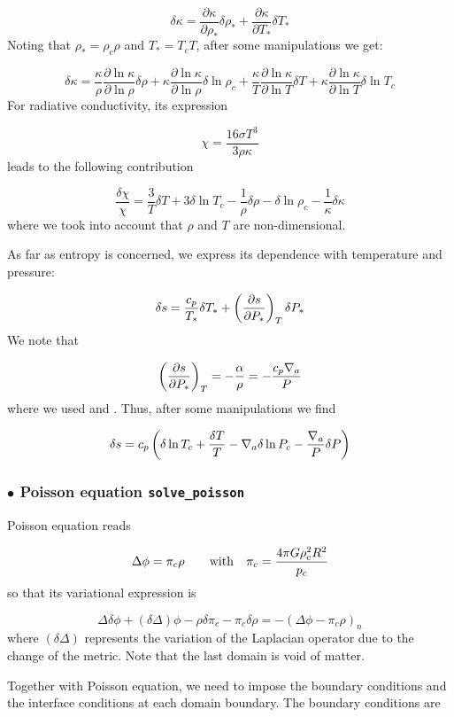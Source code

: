 \[ \delta\kappa = \frac{\partial\kappa}{\partial\rho_*}\delta\rho_* +
\frac{\partial\kappa}{\partial T_*}\delta T_*\]
Noting that $\rho_*=\rho_c\rho$ and $T_*=T_cT$, after some manipulations we
get:

\[ \delta\kappa =
\frac{\kappa}{\rho}\frac{\partial\ln\kappa}{\partial\ln\rho}\delta\rho +
\kappa\frac{\partial\ln\kappa}{\partial\ln\rho}\delta\ln\rho_c +
\frac{\kappa}{T}\frac{\partial\ln\kappa}{\partial\ln T}\delta T +
\kappa\frac{\partial\ln\kappa}{\partial\ln T}\delta\ln T_c\]
For radiative conductivity, its expression

\[ \chi = \frac{16\sigma T^3}{3\rho\kappa}\]
leads to the following contribution

\[ \frac{\delta \chi}{\chi} = \frac{3}{T}\delta T+3\delta\ln T_c
-\frac{1}{\rho}\delta\rho - \delta\ln\rho_c - \frac{1}{\kappa}\delta\kappa\]
where we took into account that $\rho$ and $T$ are non-dimensional.

As far as entropy is concerned, we express its dependence with temperature and
pressure:

\[ \delta s = \frac{c_p}{T_*}\delta T_* + \left(\frac{\partial s}{\partial
P_*}\right)_T\delta P_*\]
We note that

\[ \left(\frac{\partial s}{\partial
P_*}\right)_T = -\frac{\alpha}{\rho} = -\frac{c_p\nabla_a}{P}\]
where we used  and .
Thus, after some manipulations we find

\[ \delta s = c_p\left(\delta\ln T_c + \frac{\delta T}{T} - \nabla_a\delta\ln P_c
-\frac{\nabla_a}{P}\delta P \right)\]

\subsubsection{$\bullet$ \bf Poisson equation {\tt solve\_poisson}}

Poisson equation reads

\[ \Delta \phi = \pi_c \rho \qquad {\rm with}\quad  \pi_c = \frac{4 \pi G
\rho_c^2 R^2}{p_c}\]
so that its variational expression is 

\[ \Delta \delta\phi +(\delta\Delta)\phi - \rho\delta\pi_c  -
\pi_c\delta\rho = -(\Delta \phi - \pi_c \rho)_n \]
where $(\delta\Delta)$ represents the variation of the Laplacian operator due
to the change of the metric. Note that the last domain is void of matter.

Together with Poisson equation, we need to impose the boundary conditions and
the interface conditions at each domain boundary. The boundary conditions are


